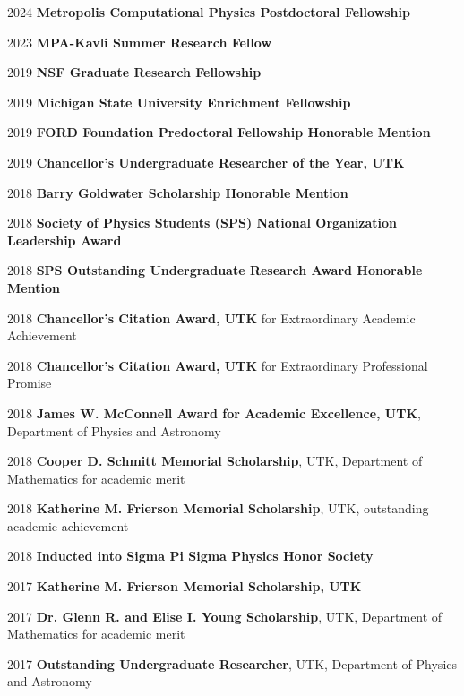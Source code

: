 \documentclass[11pt]{vitae}
\begin{document}
\begin{chronlist}
\item[2024] \textbf{Metropolis Computational Physics Postdoctoral Fellowship}
\item[2023] \textbf{MPA-Kavli Summer Research Fellow}
\item[2019] \textbf{NSF Graduate Research Fellowship}
\item[2019] \textbf{Michigan State University Enrichment Fellowship}
\item[2019] \textbf{FORD Foundation Predoctoral Fellowship Honorable Mention}
\item[2019] \textbf{Chancellor's Undergraduate Researcher of the Year, UTK}
\item[2018] \textbf{Barry Goldwater Scholarship Honorable Mention}
\item[2018] \textbf{Society of Physics Students (SPS) National Organization Leadership Award}
\item[2018] \textbf{SPS Outstanding Undergraduate Research Award Honorable Mention}
\item[2018] \textbf{Chancellor’s Citation Award, UTK} for Extraordinary Academic Achievement
\item[2018] \textbf{Chancellor’s Citation Award, UTK} for Extraordinary Professional Promise
\item[2018] \textbf{James W. McConnell Award for Academic Excellence, UTK}, Department of Physics and Astronomy
\item[2018] \textbf{Cooper D. Schmitt Memorial Scholarship}, UTK, Department of Mathematics for academic merit
\item[2018] \textbf{Katherine M. Frierson Memorial Scholarship}, UTK, outstanding academic achievement
  \item[2018] \textbf{Inducted into Sigma Pi Sigma Physics Honor Society}
  \item[2017] \textbf{Katherine M. Frierson Memorial Scholarship, UTK}
  \item[2017] \textbf{Dr. Glenn R. and Elise I. Young Scholarship}, UTK, Department of Mathematics for academic merit
  \item[2017] \textbf{Outstanding Undergraduate Researcher}, UTK, Department of Physics and Astronomy
\end{chronlist}
\end{document}
